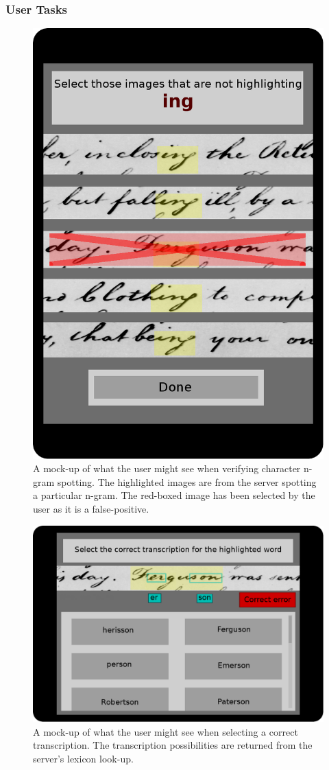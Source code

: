 \documentclass[ms]{byuprop}
\begin{document}
\subsubsection{User Tasks}

\begin{figure}[h]
    \centering
    \includegraphics[width=.4\textwidth]{userTask_spot}
    \caption{A mock-up of what the user might see when verifying character n-gram spotting. The highlighted images are from the server spotting a particular n-gram. The red-boxed image has been selected by the user as it is a false-positive.}
    \label{fig:userTask_spot}
\end{figure}

\begin{figure}[h]
    \centering
    \includegraphics[width=.6\textwidth]{userTask_trans}
    \caption{A mock-up of what the user might see when selecting a correct transcription. The transcription possibilities are returned from the server's lexicon look-up.}
    \label{fig:userTask_trans}
\end{figure}
\end{document}
